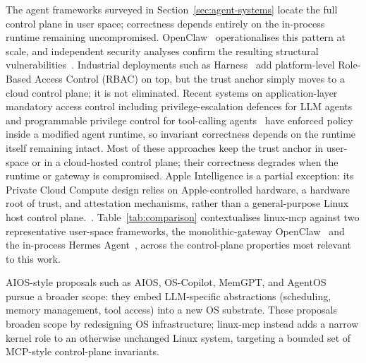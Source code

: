 The agent frameworks surveyed in Section~\ref{sec:agent-systems} locate the full control plane in user space; correctness depends entirely on the in-process runtime remaining uncompromised.
OpenClaw~\cite{openclaw2026} operationalises this pattern at scale, and independent security analyses confirm the resulting structural vulnerabilities~\cite{openclaw_security1, openclaw_security2}.
Industrial deployments such as Harness~\cite{harness2025} add platform-level Role-Based Access Control (RBAC) on top, but the trust anchor simply moves to a cloud control plane; it is not eliminated.
Recent systems on application-layer mandatory access control including privilege-escalation defences for LLM agents~\cite{ji2026seagent} and programmable privilege control for tool-calling agents~\cite{shi2025progent} have enforced policy inside a modified agent runtime, so invariant correctness depends on the runtime itself remaining intact.
Most of these approaches keep the trust anchor in user-space or in a cloud-hosted control plane; their correctness degrades when the runtime or gateway is compromised.
Apple Intelligence is a partial exception: its Private Cloud Compute design relies on Apple-controlled hardware, a hardware root of trust, and attestation mechanisms, rather than a general-purpose Linux host control plane.~\cite{apple2024pcc}.
Table~\ref{tab:comparison} contextualises linux-mcp against two representative user-space frameworks, the monolithic-gateway OpenClaw~\cite{openclaw2026} and the in-process Hermes Agent~\cite{nousresearch2026hermesagent}, across the control-plane properties most relevant to this work.


AIOS-style proposals such as AIOS, OS-Copilot, MemGPT, and AgentOS~\cite{mei2024aios, liu2026agentos, packer2023memgpt, wu2024oscopilot} pursue a broader scope: they embed LLM-specific abstractions (scheduling, memory management, tool access) into a new OS substrate.
These proposals broaden scope by redesigning OS infrastructure; linux-mcp instead adds a narrow kernel role to an otherwise unchanged Linux system, targeting a bounded set of MCP-style control-plane invariants.


